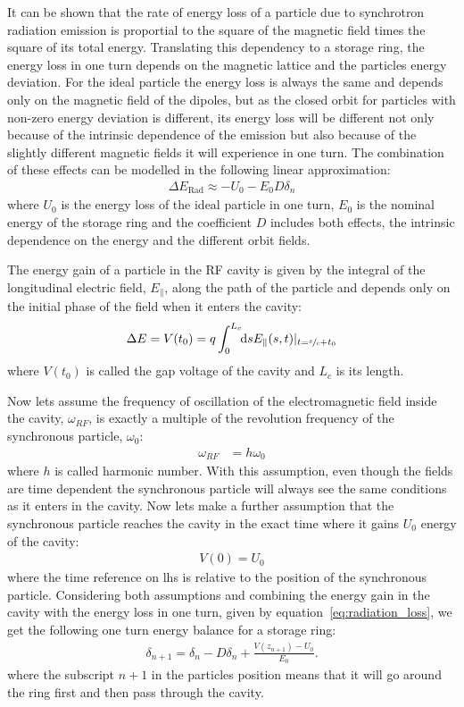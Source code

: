 	It can be shown that the rate of energy loss of a particle due to synchrotron radiation emission is proportial to the square of the magnetic field times the square of its total energy. Translating this dependency to a storage ring, the energy loss in one turn depends on the magnetic lattice and the particles energy deviation. For the ideal particle the energy loss is always the same and depends only on the magnetic field of the dipoles, but as the closed orbit for particles with non-zero energy deviation is different, its energy loss will be different not only because of the intrinsic dependence of the emission but also because of the slightly different magnetic fields it will experience in one turn. The combination of these effects can be modelled in the following linear approximation:
	\begin{align}\label{eq:radiation_loss}
		\Delta E_\text{Rad} \approx -U_0 - E_0D\delta_n
	\end{align}
	where $U_0$ is the energy loss of the ideal particle in one turn, $E_0$ is the nominal energy of the storage ring and the coefficient $D$ includes both effects, the intrinsic dependence on the energy and the different orbit fields.

	The energy gain of a particle in the RF cavity is given by the integral of the longitudinal electric field, $E_\parallel$, along the path of the particle and depends only on the initial phase of the field when it enters the cavity:
	\begin{align}
		\Delta E = V(t_0) = q\defint{s}{E_\parallel(s,t)|_{t=\sfrac{s}{c}+t_0}}{0}{L_c}
	\end{align}
	where $V(t_0)$ is called the gap voltage of the cavity and $L_c$ is its length.

	Now lets assume the frequency of oscillation of the electromagnetic field inside the cavity, $\omega_{RF}$, is exactly a multiple of the revolution frequency of the synchronous particle, $\omega_0$:
	\begin{align}\label{eq:harmonic_number}
		\omega_{RF} &= h\omega_0
	\end{align}
	where $h$ is called harmonic number. With this assumption, even though the fields are time dependent the synchronous particle will always see the same conditions as it enters in the cavity. Now lets make a further assumption that the synchronous particle reaches the cavity in the exact time where it gains $U_0$ energy of the cavity:
	\begin{align}
		V(0) = U_0
	\end{align}
	where the time reference on \gls{lhs} is relative to the position of the synchronous particle. Considering both assumptions and combining the energy gain in the cavity with the energy loss in one turn, given by equation~\eqref{eq:radiation_loss}, we get the following one turn energy balance for a storage ring:
	\begin{align}\label{eq:energy_balance}
		\delta_{n+1} = \delta_n - D\delta_n + \frac{V(z_{n+1})-U_0}{E_0}.
	\end{align}
	where the subscript $n+1$ in the particles position means that it will go around the ring first and then pass through the cavity.

